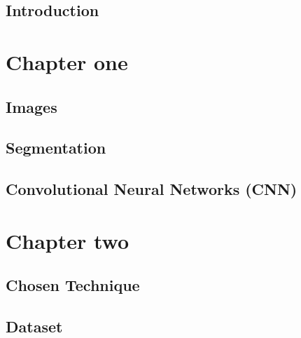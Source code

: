 \documentclass[12pt,a4paper]{report}
\begin{document}
\begin{titlepage}

\end{titlepage}


\clearpage{\pagestyle{empty}\cleardoublepage}
\tableofcontents               
{}


\clearpage{\pagestyle{empty}\cleardoublepage}
\listoffigures                          

\clearpage{\pagestyle{empty}\cleardoublepage}
\listoftables                          

\clearpage{\pagestyle{empty}\cleardoublepage}
\section*{\LARGE{Introduction}}



\chapter{Chapter one}

\section{Images}


\newpage

\section{Segmentation}


\newpage

\section{Convolutional Neural Networks (CNN)}

\chapter{Chapter two}

\section{Chosen Technique}
\section{Dataset}
\end{document}
